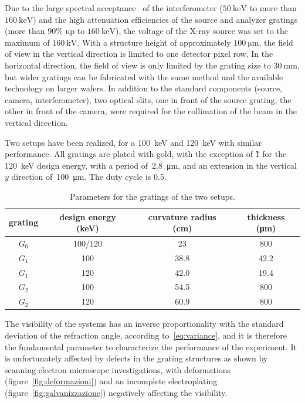 Due to the large spectral acceptance~\cite{Weitkamp2005,Thuering2013c} of the
interferometer ($\SI{50}{\kilo\electronvolt}$ to
more than $\SI{160}{\kilo\electronvolt}$) and the high attenuation efficiencies of
the source and analyzer gratings (more than $90\%$ up to
$\SI{160}{\kilo\electronvolt}$), the voltage of the X-ray source was set to
the maximum of $\SI{160}{\kilo\volt}$. With a structure height of
approximately $\SI{100}{\micro\metre}$, the field of view in the vertical
direction is limited to one detector pixel row. In the horizontal direction,
the field of view is only limited by the grating size to
$\SI{30}{\milli\metre}$, but wider gratings can be fabricated with the same
method and the available technology on larger wafers. In addition to the standard components (source,
camera, interferometer), two optical slits, one in front of the source
grating, the other in front of the camera, were required for the collimation
of the beam in the vertical direction. 

Two setups have been realized, for a \SI{100}{\kilo\eV} and
\SI{120}{\kilo\eV} with similar performance. All gratings are
plated with gold, with the exception of \G1 for the \SI{120}{\kilo\eV}
design energy, with a period of~\SI{2.8}{\micro\metre}, and an extension in
the vertical $y$ direction of~\SI{100}{\micro\metre}. The 
duty cycle is 0.5.

\begin{table}[htb]
    \centering
    \begin{tabular}{*4c}
        \toprule
        grating & design energy (\si{\kilo\eV}) & curvature radius
        (\si{\centi\metre}) & thickness (\si{\micro\metre}) \\
        \midrule
        $G_0$ & \num{100}/\num{120} & \num{23} & \num{800} \\
        $G_1$ & \num{100} & \num{38.8} & \num{42.2} \\
        $G_1$ & \num{120} & \num{42.0} & \num{19.4} \\
        $G_2$ & \num{100} & \num{54.5} & \num{800} \\
        $G_2$ & \num{120} & \num{60.9} & \num{800} \\
        \bottomrule
    \end{tabular}
    \caption{Parameters for the gratings of the two setups.}
    \label{tab:gratings}
\end{table}

The visibility of the systems has an inverse proportionality with the
standard deviation of the refraction angle, according
to~\eqref{eq:variance}, and it is therefore the fundamental parameter to
characterize the performance of the experiment. It is unfortunately affected
by defects in the grating structures as shown by scanning electron
microscope investigations, with deformations (figure~\ref{fig:deformazioni})
and an incomplete electroplating (figure~\ref{fig:galvanizzazione})
negatively affecting the visibility.

